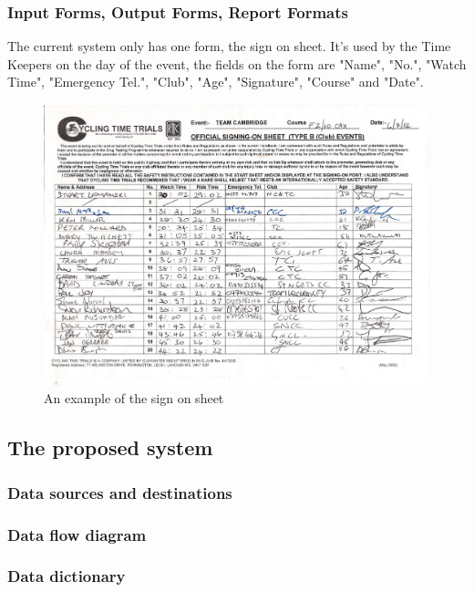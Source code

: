 \subsubsection{Input Forms, Output Forms, Report Formats}
The current system only has one form, the sign on sheet. It's used by the Time Keepers on the day of the event, the fields on the form are "Name", "No.", "Watch Time", "Emergency Tel.", "Club", "Age", "Signature", "Course" and "Date".

\begin{figure}[H]
    \includegraphics[width=\textwidth]{./SignOnTimeKeepersSheet.pdf}
    \caption{An example of the sign on sheet} \label{fig:Sign on Sheet}
\end{figure}
\subsection{The proposed system}

\subsubsection{Data sources and destinations}

\subsubsection{Data flow diagram}

\subsubsection{Data dictionary}

